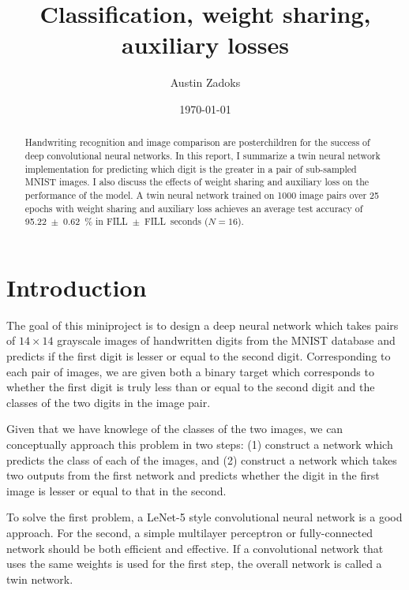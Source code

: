 \documentclass[prl, article, twocolumn]{revtex4-1}
\begin{document}
\title{Classification, weight sharing, auxiliary losses}
\date{\today}
\author{Austin Zadoks}
\noaffiliation

\begin{abstract}
    Handwriting recognition and image comparison are posterchildren for the success of deep convolutional neural networks. In this report, I summarize a twin neural network implementation for predicting which digit is the greater in a pair of sub-sampled MNIST images. I also discuss the effects of weight sharing and auxiliary loss on the performance of the model. A twin neural network trained on 1000 image pairs over 25 epochs with weight sharing and auxiliary loss achieves an average test accuracy of 95.22~$\pm$~0.62~\% in FILL~$\pm$~FILL~seconds ($N=16$).
\end{abstract}

\maketitle

\section{Introduction}
The goal of this miniproject is to design a deep neural network which takes pairs of $14 \times 14$ grayscale images of handwritten digits from the MNIST database and predicts if the first digit is lesser or equal to the second digit.
Corresponding to each pair of images, we are given both a binary target which corresponds to whether the first digit is truly less than or equal to the second digit and the classes of the two digits in the image pair.

Given that we have knowlege of the classes of the two images, we can conceptually approach this problem in two steps: (1) construct a network which predicts the class of each of the images, and (2) construct a network which takes two outputs from the first network and predicts whether the digit in the first image is lesser or equal to that in the second.

To solve the first problem, a LeNet-5 style convolutional neural network is a good approach. For the second, a simple multilayer perceptron or fully-connected network should be both efficient and effective. If a convolutional network that uses the same weights is used for the first step, the overall network is called a twin network.
\end{document}
